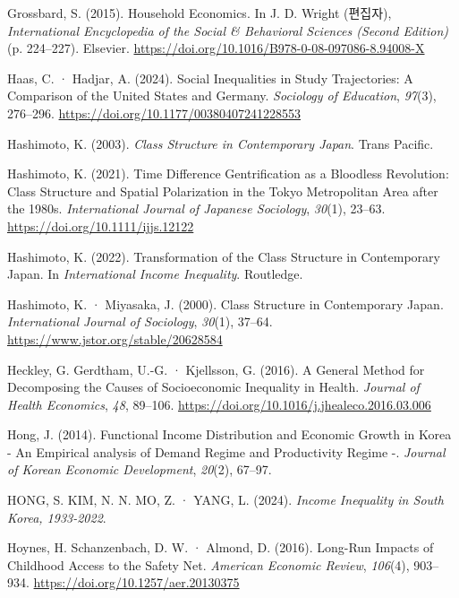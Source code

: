 \documentclass[
  letterpaper,
  DIV=11,
  numbers=noendperiod]{scrartcl}
\newlength{\cslhangindent}
\newenvironment{CSLReferences}[2] %
 {\begin{list}{}{%
  \setlength{\itemindent}{0pt}
  \setlength{\leftmargin}{0pt}
  \setlength{\parsep}{0pt}
  \ifodd #1
   \setlength{\leftmargin}{\cslhangindent}
   \setlength{\itemindent}{-1\cslhangindent}
  \fi
  \setlength{\itemsep}{#2\baselineskip}}}
 {\end{list}}
\begin{document}
\begin{CSLReferences}{1}{0}
Grossbard, S. (2015). Household {Economics}. In J. D. Wright (편집자),
\emph{International {Encyclopedia} of the {Social} \& {Behavioral
Sciences} ({Second Edition})} (p. 224--227). Elsevier.
\url{https://doi.org/10.1016/B978-0-08-097086-8.94008-X}

Haas, C. · Hadjar, A. (2024). Social {Inequalities} in {Study
Trajectories}: {A Comparison} of the {United States} and {Germany}.
\emph{Sociology of Education}, \emph{97}(3), 276--296.
\url{https://doi.org/10.1177/00380407241228553}

Hashimoto, K. (2003). \emph{Class {Structure} in {Contemporary Japan}}.
Trans Pacific.

Hashimoto, K. (2021). Time {Difference Gentrification} as a {Bloodless
Revolution}: {Class Structure} and {Spatial Polarization} in the {Tokyo
Metropolitan Area} after the 1980s. \emph{International Journal of
Japanese Sociology}, \emph{30}(1), 23--63.
\url{https://doi.org/10.1111/ijjs.12122}

Hashimoto, K. (2022). Transformation of the Class Structure in
Contemporary {Japan}. In \emph{International {Income Inequality}}.
Routledge.

Hashimoto, K. · Miyasaka, J. (2000). Class {Structure} in {Contemporary
Japan}. \emph{International Journal of Sociology}, \emph{30}(1), 37--64.
\url{https://www.jstor.org/stable/20628584}

Heckley, G. Gerdtham, U.-G. · Kjellsson, G. (2016). A General Method for
Decomposing the Causes of Socioeconomic Inequality in Health.
\emph{Journal of Health Economics}, \emph{48}, 89--106.
\url{https://doi.org/10.1016/j.jhealeco.2016.03.006}

Hong, J. (2014). {Functional Income Distribution and Economic Growth in
Korea - An Empirical analysis of Demand Regime and Productivity Regime
-}. \emph{Journal of Korean Economic Development}, \emph{20}(2), 67--97.

HONG, S. KIM, N. N. MO, Z. · YANG, L. (2024). \emph{Income {Inequality}
in {South Korea}, 1933-2022}.

Hoynes, H. Schanzenbach, D. W. · Almond, D. (2016). Long-{Run Impacts}
of {Childhood Access} to the {Safety Net}. \emph{American Economic
Review}, \emph{106}(4), 903--934.
\url{https://doi.org/10.1257/aer.20130375}


\end{CSLReferences}
\end{document}
